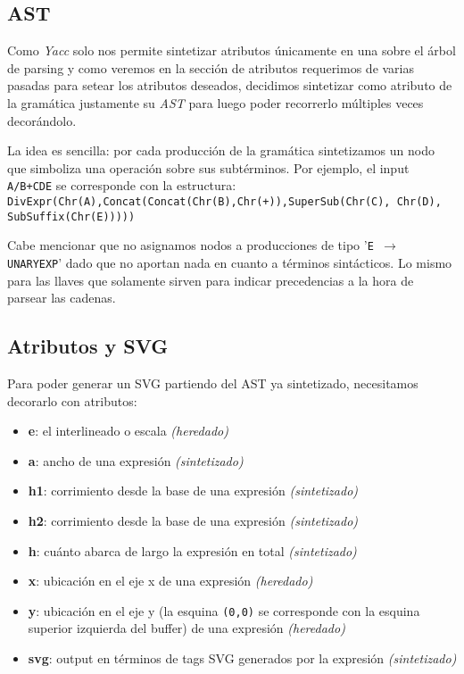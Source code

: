 \subsection{AST}

Como \emph{Yacc} solo nos permite sintetizar atributos únicamente en una  sobre el árbol de parsing y como veremos en la sección de atributos requerimos de varias pasadas para setear los atributos deseados, decidimos sintetizar como atributo de la gramática justamente su \emph{AST} para luego poder recorrerlo múltiples veces decorándolo. \newline

La idea es sencilla: por cada producción de la gramática sintetizamos un nodo que simboliza una operación sobre sus subtérminos. Por ejemplo, el input \texttt{A/B+C\super D\sub E} se corresponde con la estructura: \newline \texttt{DivExpr(Chr(A),Concat(Concat(Chr(B),Chr(+)),SuperSub(Chr(C), Chr(D), SubSuffix(Chr(E)))))} \newline

Cabe mencionar que no asignamos nodos a producciones de tipo '\texttt{E $\rightarrow$ UNARYEXP}' dado que no aportan nada en cuanto a términos sintácticos. Lo mismo para las llaves que solamente sirven para indicar precedencias a la hora de parsear las cadenas.

\subsection{Atributos y SVG}

Para poder generar un SVG partiendo del AST ya sintetizado, necesitamos decorarlo con atributos:

\begin{itemize}
	\item \textbf{e}: el interlineado o escala \emph{(heredado)}
	\item \textbf{a}: ancho de una expresión \emph{(sintetizado)}
	\item \textbf{h1}: corrimiento  desde la base de una expresión \emph{(sintetizado)}
	\item \textbf{h2}: corrimiento  desde la base de una expresión \emph{(sintetizado)}
	\item \textbf{h}: cuánto abarca de largo la expresión en total \emph{(sintetizado)}
	\item \textbf{x}: ubicación en el eje x de una expresión \emph{(heredado)}
	\item \textbf{y}: ubicación en el eje y (la esquina \texttt{(0,0)} se corresponde con la esquina superior izquierda del buffer) de una expresión \emph{(heredado)}
	\item \textbf{svg}: output en términos de tags SVG generados por la expresión \emph{(sintetizado)}
\end{itemize}

